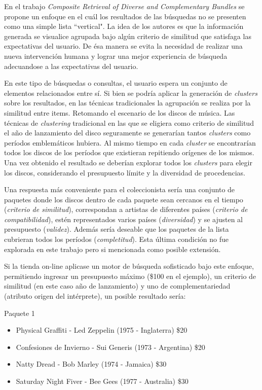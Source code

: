 En el trabajo {\em Composite Retrieval of Diverse and Complementary Bundles} \cite{journals/tkde/Amer-YahiaBCFMZ14} se propone un enfoque en el cuál los resultados de las búsquedas no se presenten como una simple lista ``vertical". La idea de los autores es que la información generada se visualice agrupada bajo algún criterio de similitud que satisfaga las expectativas del usuario. De ésa manera se evita la necesidad de realizar una nueva intervención humana y lograr una mejor experiencia de búsqueda adecuandose a las expectativas del usuario.

En este tipo de búsquedas o consultas, el usuario espera un conjunto de elementos relacionados entre sí. Si bien se podría aplicar la generación de {\em clusters} sobre los resultados, en las técnicas tradicionales la agrupación se realiza por la similitud entre items. Retomando el escenario de los discos de música. Las técnicas de {\em clustering} tradicional en las que se eligiera como criterio de similitud el año de lanzamiento del disco seguramente se generarían tantos {\em clusters} como períodos emblemáticos hubiera. Al mismo tiempo en cada {\em cluster} se encontrarían todos los discos de los períodos que existieran repitiendo orígenes de los mismos. Una vez obtenido el resultado se deberían explorar todos los {\em clusters} para elegir los discos, considerando el presupuesto límite y la diversidad de procedencias.

Una respuesta más conveniente para el coleccionista sería una conjunto de paquetes donde los discos dentro de cada paquete sean cercanos en el tiempo ({\em criterio de similitud}), correspondan a artistas de diferentes países ({\em criterio de compatibilidad}), estén representados varios países ({\em diversidad}) y se ajusten al presupuesto ({\em validez}). Además sería deseable que los paquetes de la lista cubrieran todos los períodos ({\em completitud}). Esta última condición no fue explorada en este trabajo pero si mencionada como posible extensión.

Si la tienda on-line aplicase un motor de búsqueda sofisticado bajo este enfoque, permitiendo ingresar un presupuesto máximo (\$100 en el ejemplo), un criterio de similitud (en este caso año de lanzamiento) y uno de complementariedad (atributo origen del intérprete), un posible resultado sería:

\begin{mybox}{Paquete 1}
	\begin{itemize}
		\item {\scriptsize Physical Graffiti - Led Zeppelin (1975 - Inglaterra) \$20}
		\item {\scriptsize Confesiones de Invierno - Sui Generis (1973 - Argentina) \$20}
		\item {\scriptsize Natty Dread - Bob Marley (1974 - Jamaica) \$30}
		\item {\scriptsize Saturday Night Fiver - Bee Gees (1977 - Australia) \$30}
	\end{itemize}
\end{mybox}

